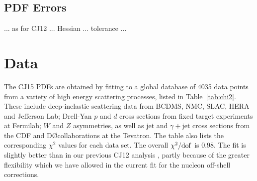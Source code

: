 \documentclass[aps,prd,amsmath,preprint]{revtex4}
\begin{document}
\subsection{PDF Errors}
\label{ssec:errors}

... as for CJ12 ... Hessian ... tolerance ...


\section{Data}
\label{sec:data}

The CJ15 PDFs are obtained by fitting to a global database of 4035
data points from a variety of high energy scattering processes,
listed in Table~\ref{tab:chi2}.
These include
  deep-inelastic scattering data from BCDMS, NMC, SLAC, HERA and
Jefferson Lab;
  Drell-Yan $p$ and $d$ cross sections from fixed target experiments
at Fermilab;
  $W$ and $Z$ asymmetries, as well as jet and $\gamma+$jet cross
sections from the CDF and D\O collaborations at the Tevatron.
%
The table also lists the corresponding $\chi^2$ values for each
data set.  The overall $\chi^2/{\rm dof}$ is 0.98.
The fit is slightly better than in our previous CJ12 analysis
\cite{CJ12}, partly because of the greater flexibility which
we have allowed in the current fit for the nucleon off-shell
corrections.
\end{document}
